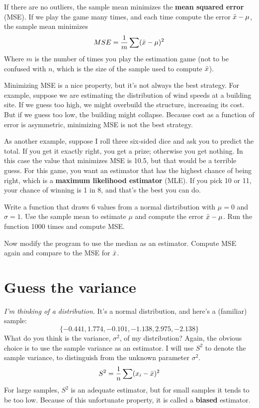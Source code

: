 \documentclass[12pt]{book}
\begin{document}
If there are no outliers, the sample mean minimizes the {\bf mean squared
error} (MSE).  If we play the game many times, and each time
compute the error $\bar{x} - \mu$, the sample mean minimizes
%
\[ MSE = \frac{1}{m} \sum (\bar{x} - \mu)^2 \]
%
Where $m$ is the number of times you play the estimation game (not to
be confused with $n$, which is the size of the sample used to compute
$\bar{x}$). 

Minimizing MSE is a nice property, but it's not always the best
strategy.  For example, suppose we are estimating the distribution of
wind speeds at a building site.  If we guess too high, we might
overbuild the structure, increasing its cost.  But if we guess too
low, the building might collapse.  Because cost as a function of
error is asymmetric, minimizing MSE is not the best strategy.

As another example, suppose I roll three six-sided dice and ask you
to predict the total.  If you get it exactly right, you get a prize;
otherwise you get nothing.  In this case the value that minimizes MSE
is 10.5, but that would be a terrible guess.  For this game, you
want an estimator that has the highest chance of being right, which is
a {\bf maximum likelihood estimator} (MLE).  If you pick 10 or 11, your
chance of winning is 1 in 8, and that's the best you can do.

\begin{ex}

Write a function that draws 6 values from a normal distribution with
$\mu=0$ and $\sigma=1$.  Use the sample mean to estimate $\mu$ and
compute the error $\bar{x} - \mu$.  Run the function 1000 times and
compute MSE.

Now modify the program to use the median as an
estimator.  Compute MSE again and compare to the MSE for $\bar{x}$.

\end{ex}


\section{Guess the variance}

{\em I'm thinking of a distribution.}  It's a normal distribution, and 
here's a (familiar) sample:
%
\[ \{ -0.441, 1.774, -0.101, -1.138, 2.975, -2.138 \} \]
%
What do you think is the variance, $\sigma^2$, of my distribution?
Again, the obvious choice is to use the sample variance as an estimator.
I will use $S^2$ to denote the sample variance, to distinguish from the
unknown parameter $\sigma^2$.
%
\[ S^2 = \frac{1}{n} \sum (x_i - \bar{x})^2 \] 
%
For large samples, $S^2$ is an adequate estimator, but for small
samples it tends to be too low.  Because of this unfortunate
property, it is called a {\bf biased} estimator.
\end{document}
